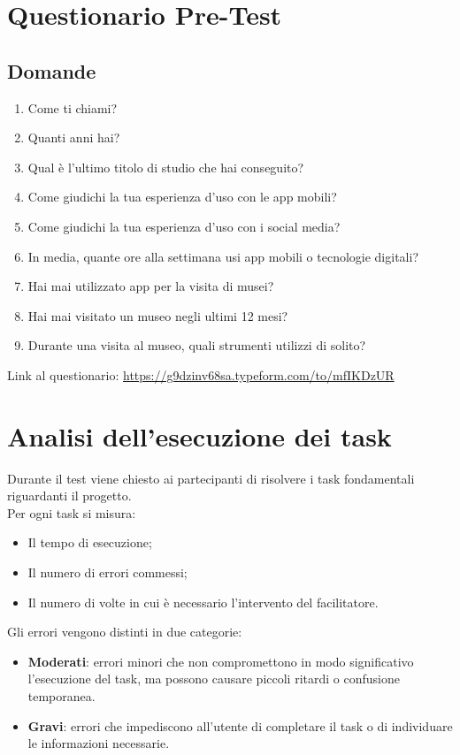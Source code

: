 \documentclass{article}
\begin{document}
\section{Questionario Pre-Test}
\subsection*{Domande}
\begin{enumerate}
    \item Come ti chiami?
    \item Quanti anni hai?
    \item Qual \`e l'ultimo titolo di studio che hai conseguito?
    \item Come giudichi la tua esperienza d’uso con le app mobili?
    \item Come giudichi la tua esperienza d'uso con i social media?
    \item In media, quante ore alla settimana usi app mobili o tecnologie digitali?
    \item Hai mai utilizzato app per la visita di musei?
    \item Hai mai visitato un museo negli ultimi 12 mesi?
    \item Durante una visita al museo, quali strumenti utilizzi di solito?
\end{enumerate}

\noindent Link al questionario: \url{https://g9dzinv68sa.typeform.com/to/mfIKDzUR}

\section{Analisi dell’esecuzione dei task}
Durante il test viene chiesto ai partecipanti di risolvere i task fondamentali riguardanti il progetto.\\
Per ogni task si misura:
\begin{itemize}
    \item Il tempo di esecuzione;
    \item Il numero di errori commessi;
    \item Il numero di volte in cui \`e necessario l’intervento del facilitatore.
\end{itemize}
Gli errori vengono distinti in due categorie:
\begin{itemize}
    \item \textbf{Moderati}: errori minori che non compromettono in modo significativo l'esecuzione del task, ma possono causare piccoli ritardi o confusione temporanea. 
    \item \textbf{Gravi}: errori che impediscono all'utente di completare il task o di individuare le informazioni necessarie.
\end{itemize}
\end{document}
